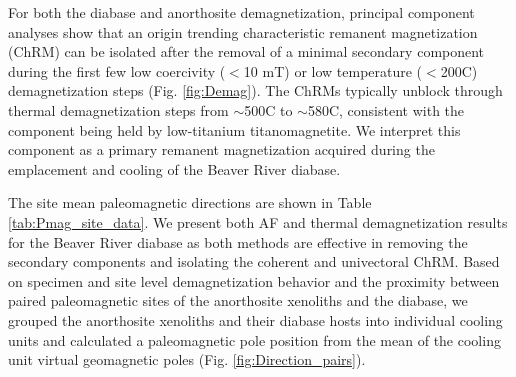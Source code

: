 For both the diabase and anorthosite demagnetization, principal component analyses show that an origin trending characteristic remanent magnetization (ChRM) can be isolated after the removal of a minimal secondary component during the first few low coercivity ($<$10 mT) or low temperature ($<$200\textdegree C) demagnetization steps (Fig. \ref{fig:Demag}). The ChRMs typically unblock through thermal demagnetization steps from $\sim$500\textdegree C to $\sim$580\textdegree C, consistent with the component being held by low-titanium titanomagnetite. We interpret this component as a primary remanent magnetization acquired during the emplacement and cooling of the Beaver River diabase.

The site mean paleomagnetic directions are shown in Table \ref{tab:Pmag_site_data}. We present both AF and thermal demagnetization results for the Beaver River diabase as both methods are effective in removing the secondary components and isolating the coherent and univectoral ChRM. Based on specimen and site level demagnetization behavior and the proximity between paired paleomagnetic sites of the anorthosite xenoliths and the diabase, we grouped the anorthosite xenoliths and their diabase hosts into individual cooling units and calculated a paleomagnetic pole position from the mean of the cooling unit virtual geomagnetic poles (Fig. \ref{fig:Direction_pairs}). 

